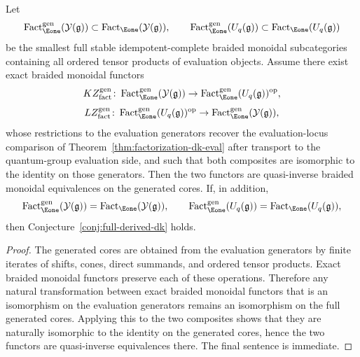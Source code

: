 \begin{proposition}
\label{prop:yangian-dk3-generated-core}
Let
\[
\operatorname{Fact}_{\Eone}^{\mathrm{gen}}(\mathcal{Y}(\mathfrak{g}))
\subset \operatorname{Fact}_{\Eone}(\mathcal{Y}(\mathfrak{g})),
\qquad
\operatorname{Fact}_{\Eone}^{\mathrm{gen}}(U_q(\mathfrak{g}))
\subset \operatorname{Fact}_{\Eone}(U_q(\mathfrak{g}))
\]
be the smallest full stable idempotent-complete braided monoidal
subcategories containing all ordered tensor products of evaluation
objects.  Assume there exist exact braided monoidal functors
\[
KZ_{\mathrm{fact}}^{\mathrm{gen}}\colon
\operatorname{Fact}_{\Eone}^{\mathrm{gen}}(\mathcal{Y}(\mathfrak{g}))
\to
\operatorname{Fact}_{\Eone}^{\mathrm{gen}}(U_q(\mathfrak{g}))^{\mathrm{op}},
\]
\[
LZ_{\mathrm{fact}}^{\mathrm{gen}}\colon
\operatorname{Fact}_{\Eone}^{\mathrm{gen}}(U_q(\mathfrak{g}))^{\mathrm{op}}
\to
\operatorname{Fact}_{\Eone}^{\mathrm{gen}}(\mathcal{Y}(\mathfrak{g})),
\]
whose restrictions to the evaluation generators recover the
evaluation-locus comparison of
Theorem~\ref{thm:factorization-dk-eval} after transport to the
quantum-group evaluation side, and such that both composites are
isomorphic to the identity on those generators.  Then the two functors
are quasi-inverse braided monoidal equivalences on the generated cores.
If, in addition,
\[
\operatorname{Fact}_{\Eone}^{\mathrm{gen}}(\mathcal{Y}(\mathfrak{g}))
=
\operatorname{Fact}_{\Eone}(\mathcal{Y}(\mathfrak{g})),
\qquad
\operatorname{Fact}_{\Eone}^{\mathrm{gen}}(U_q(\mathfrak{g}))
=
\operatorname{Fact}_{\Eone}(U_q(\mathfrak{g})),
\]
then Conjecture~\ref{conj:full-derived-dk} holds.
\end{proposition}

\begin{proof}
The generated cores are obtained from the evaluation generators by
finite iterates of shifts, cones, direct summands, and ordered tensor
products.  Exact braided monoidal functors preserve each of these
operations.  Therefore any natural transformation between exact
braided monoidal functors that is an isomorphism on the evaluation
generators remains an isomorphism on the full generated cores.  Applying
this to the two composites shows that they are naturally isomorphic to
the identity on the generated cores, hence the two functors are
quasi-inverse equivalences there.  The final sentence is immediate.
\end{proof}

